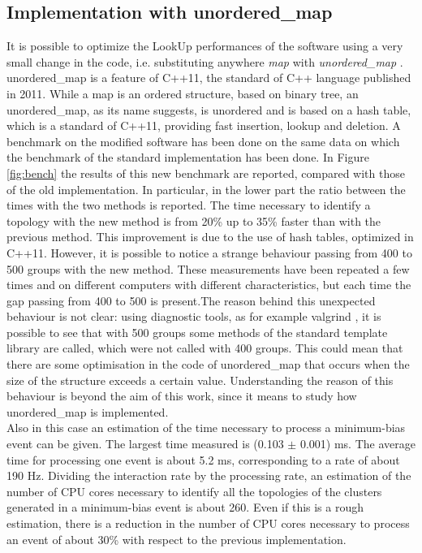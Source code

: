 \subsection{Implementation with unordered\_map}
It is possible to optimize the LookUp performances of the software using a very small change in the code, i.e. substituting anywhere \textit{map} with \textit{unordered\_map} \cite{unord}. unordered\_map is a feature of C++11, the standard of C++ language published in 2011. While a map is an ordered structure, based on binary tree, an unordered\_map, as its name suggests, is unordered and is based on a hash table, which is a standard of C++11, providing fast insertion, lookup and deletion. A benchmark on the modified software has been done on the same data on which the benchmark of the standard implementation has been done.
In Figure \ref{fig:bench} the results of this new benchmark are reported, compared with those of the old implementation. In particular, in the lower part the ratio between the times with the two methods is reported. The time necessary to identify a topology with the new method is from 20\% up to 35\% faster than with the previous method. This improvement is due to the use of hash tables, optimized in C++11. However, it is possible to notice a strange behaviour passing from 400 to 500 groups with the new method. These measurements have been repeated a few times and on different computers with different characteristics, but each time the gap passing from 400 to 500 is present.The reason behind this unexpected behaviour is not clear: using diagnostic tools, as for example valgrind \cite{valgrind}, it is possible to see that with 500 groups some methods of the standard template library are called, which were not called with 400 groups. This could mean that there are some optimisation in the code of unordered\_map that occurs when the size of the structure exceeds a certain value. Understanding the reason of this behaviour is beyond the aim of this work, since it means to study how unordered\_map is implemented.\\
Also in this case an estimation of the time necessary to process a minimum-bias event can be given. The largest time measured is (0.103 $\pm$ 0.001) ms. The average time for processing one event is about 5.2 ms, corresponding to a rate of about 190 Hz. Dividing the interaction rate by the processing rate, an estimation of the number of CPU cores necessary to identify all the topologies of the clusters generated in a minimum-bias event is about 260. Even if this is a rough estimation, there is a reduction in the number of CPU cores necessary to process an event of about 30\% with respect to the previous implementation.
